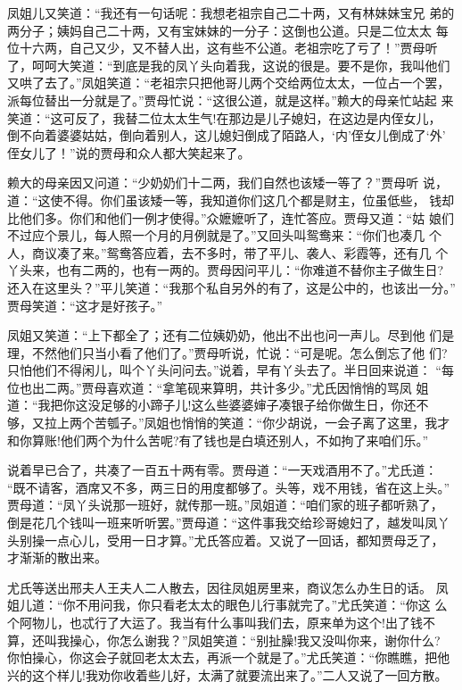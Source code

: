 凤姐儿又笑道：“我还有一句话呢：我想老祖宗自己二十两，又有林妹妹宝兄
弟的两分子；姨妈自己二十两，又有宝妹妹的一分子：这倒也公道。只是二位太太
每位十六两，自己又少，又不替人出，这有些不公道。老祖宗吃了亏了！”贾母听
了，呵呵大笑道：“到底是我的凤丫头向着我，这说的很是。要不是你，我叫他们
又哄了去了。”凤姐笑道：“老祖宗只把他哥儿两个交给两位太太，一位占一个罢，
派每位替出一分就是了。”贾母忙说：“这很公道，就是这样。”赖大的母亲忙站起
来笑道：“这可反了，我替二位太太生气!在那边是儿子媳妇，在这边是内侄女儿，
倒不向着婆婆姑姑，倒向着别人，这儿媳妇倒成了陌路人，‘内’侄女儿倒成了‘外’
侄女儿了！”说的贾母和众人都大笑起来了。

赖大的母亲因又问道：“少奶奶们十二两，我们自然也该矮一等了？”贾母听
说，道：“这使不得。你们虽该矮一等，我知道你们这几个都是财主，位虽低些，
钱却比他们多。你们和他们一例才使得。”众嬷嬷听了，连忙答应。贾母又道：“姑
娘们不过应个景儿，每人照一个月的月例就是了。”又回头叫鸳鸯来：“你们也凑几
个人，商议凑了来。”鸳鸯答应着，去不多时，带了平儿、袭人、彩霞等，还有几
个丫头来，也有二两的，也有一两的。贾母因问平儿：“你难道不替你主子做生日?
还入在这里头？”平儿笑道：“我那个私自另外的有了，这是公中的，也该出一分。”
贾母笑道：“这才是好孩子。”

凤姐又笑道：“上下都全了；还有二位姨奶奶，他出不出也问一声儿。尽到他
们是理，不然他们只当小看了他们了。”贾母听说，忙说：“可是呢。怎么倒忘了他
们?只怕他们不得闲儿，叫个丫头问问去。”说着，早有丫头去了。半日回来说道：
“每位也出二两。”贾母喜欢道：“拿笔砚来算明，共计多少。”尤氏因悄悄的骂凤
姐道：“我把你这没足够的小蹄子儿!这么些婆婆婶子凑银子给你做生日，你还不
够，又拉上两个苦瓠子。”凤姐也悄悄的笑道：“你少胡说，一会子离了这里，我才
和你算账!他们两个为什么苦呢?有了钱也是白填还别人，不如拘了来咱们乐。”

说着早已合了，共凑了一百五十两有零。贾母道：“一天戏酒用不了。”尤氏道：
“既不请客，酒席又不多，两三日的用度都够了。头等，戏不用钱，省在这上头。”
贾母道：“凤丫头说那一班好，就传那一班。”凤姐道：“咱们家的班子都听熟了，
倒是花几个钱叫一班来听听罢。”贾母道：“这件事我交给珍哥媳妇了，越发叫凤丫
头别操一点心儿，受用一日才算。”尤氏答应着。又说了一回话，都知贾母乏了，
才渐渐的散出来。

尤氏等送出邢夫人王夫人二人散去，因往凤姐房里来，商议怎么办生日的话。
凤姐儿道：“你不用问我，你只看老太太的眼色儿行事就完了。”尤氏笑道：“你这
么个阿物儿，也忒行了大运了。我当有什么事叫我们去，原来单为这个!出了钱不
算，还叫我操心，你怎么谢我？”凤姐笑道：“别扯臊!我又没叫你来，谢你什么?
你怕操心，你这会子就回老太太去，再派一个就是了。”尤氏笑道：“你瞧瞧，把他
兴的这个样儿!我劝你收着些儿好，太满了就要流出来了。”二人又说了一回方散。

